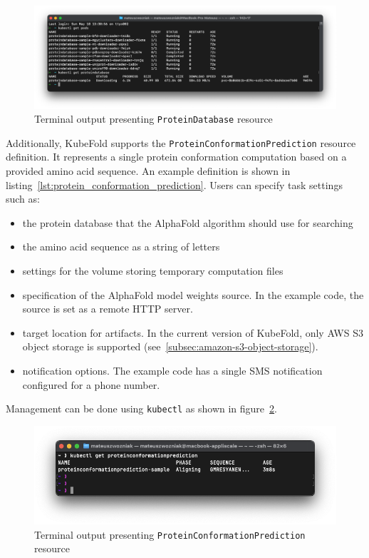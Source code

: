 \begin{figure}[htbp]
    \centering
    \includegraphics[width=\textwidth]{images/proteindatabase_terminal}
    \caption{Terminal output presenting \texttt{ProteinDatabase} resource}
    \label{fig:proteindatabase_terminal}
\end{figure}

Additionally, KubeFold supports the \texttt{ProteinConformationPrediction} resource definition.
It represents a single protein conformation computation based on a provided amino acid sequence.
An example definition is shown in listing~\ref{lst:protein_conformation_prediction}.
Users can specify task settings such as:
\begin{itemize}
    \item the protein database that the AlphaFold algorithm should use for searching
    \item the amino acid sequence as a string of letters
    \item settings for the volume storing temporary computation files
    \item specification of the AlphaFold model weights source.
    In the example code, the source is set as a remote HTTP server.
    \item target location for artifacts.
    In the current version of KubeFold, only AWS S3 object storage is supported (see~\ref{subsec:amazon-s3-object-storage}).
    \item notification options.
    The example code has a single SMS notification configured for a phone number.
\end{itemize}
Management can be done using \texttt{kubectl} as shown in figure~\ref{fig:proteinconformationprediction_terminal}.

\begin{figure}[htbp]
    \centering
    \includegraphics[width=\textwidth]{images/proteinconformationprediction_terminal}
    \caption{Terminal output presenting \texttt{ProteinConformationPrediction} resource}
    \label{fig:proteinconformationprediction_terminal}
\end{figure}

